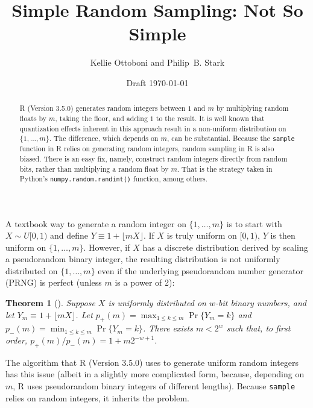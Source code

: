 \documentclass[12pt]{article}
\title{Simple Random Sampling: Not So Simple}
\author{Kellie Ottoboni and Philip~B. Stark}
\date{Draft \today}
\newtheorem{theorem}{Theorem}[section]
\begin{document}
\maketitle


\begin{abstract}
R (Version 3.5.0) generates random integers between $1$ and $m$
by multiplying random floats by $m$, taking the floor, and adding $1$ to the result.
It is well known that quantization effects inherent in this approach result in a 
non-uniform distribution on $\{ 1, \ldots, m\}$.
The difference, which depends on $m$, can be substantial.
Because the \texttt{sample} function in R relies on generating random integers,
random sampling in R is also biased.
There is an easy fix, namely, construct random integers directly from random bits, rather than
multiplying a random float by $m$.
That is the strategy taken in Python's \texttt{numpy.random.randint()} function, among
others.
\end{abstract}



A textbook way to generate a random integer on 
$\{1, \dots, m\}$ is to start with $X \sim U[0,1)$ and define $Y \equiv 1 + \lfloor mX \rfloor$. 
If $X$ is truly uniform on $[0,1)$, $Y$ is then uniform on $\{1, \dots, m\}$.
However, if $X$ has a discrete distribution derived by scaling a pseudorandom binary integer, 
the resulting distribution is not uniformly distributed on 
$\{1, \ldots, m \}$ even if the underlying pseudorandom number generator 
(PRNG) is perfect (unless $m$ is a power of 2):

\begin{theorem}[\citet{knuth_art_1997}] %
Suppose $X$ is uniformly distributed on $w$-bit binary numbers, and
let $Y_m \equiv 1 + \lfloor mX \rfloor$.
Let $p_+(m) = \max_{1 \le k \le m} \Pr\{Y_m = k\}$ and $p_-(m) = \min_{1 \le k \le m} \Pr\{Y_m = k\}$.
There exists $m < 2^w$ such that, to first order, 
$p_+(m)/p_-(m) = 1 + m2^{-w+1}$.
\end{theorem}

The algorithm that R (Version 3.5.0) \citep{R_2018} uses to generate uniform random integers
has this issue (albeit in a slightly more complicated form, because, depending on $m$,
R uses pseudorandom binary integers of different lengths). 
Because \texttt{sample} relies on random integers, it inherits the problem.
\end{document}
